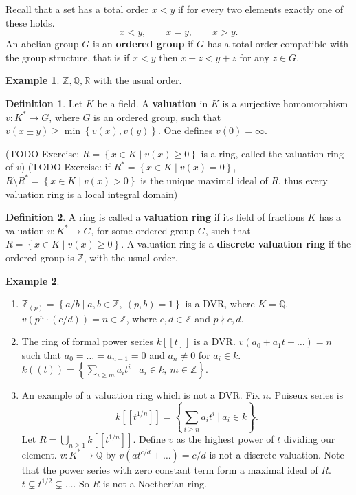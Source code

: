 \documentclass{article}
\newcommand{\Z}{\mathbb{Z}}
\newcommand{\Q}{\mathbb{Q}}
\newcommand{\R}{\mathbb{R}}
\newcommand{\rb}[1]{\left( #1 \right)}
\renewcommand{\sb}[1]{\left[ #1 \right]}
\newcommand{\cb}[1]{\left\{ #1 \right\}}
\theoremstyle{definition}\newtheorem{definition}{Definition}[section]
\theoremstyle{definition}\newtheorem{remark}[definition]{Remark}
\theoremstyle{definition}\newtheorem*{example}{Example}
\theoremstyle{definition}\newtheorem*{note}{Note}
\begin{document}
Recall that a set has a total order $ x < y $ if for every two elements exactly one of these holds.
$$ x < y, \qquad x = y, \qquad x > y. $$
An abelian group $ G $ is an \textbf{ordered group} if $ G $ has a total order compatible with the group structure, that is if $ x < y $ then $ x + z < y + z $ for any $ z \in G $.

\begin{example}
$ \Z, \Q, \R $ with the usual order.
\end{example}

\begin{definition}
Let $ K $ be a field. A \textbf{valuation} in $ K $ is a surjective homomorphism $ v : K^* \to G $, where $ G $ is an ordered group, such that $ v\rb{x \pm y} \ge \min\cb{v\rb{x}, v\rb{y}} $. One defines $ v\rb{0} = \infty $.
\end{definition}

(TODO Exercise: $ R = \cb{x \in K \mid v\rb{x} \ge 0} $ is a ring, called the valuation ring of $ v $)
(TODO Exercise: if $ R^* = \cb{x \in K \mid v\rb{x} = 0} $, $ R \setminus R^* = \cb{x \in K \mid v\rb{x} > 0} $ is the unique maximal ideal of $ R $, thus every valuation ring is a local integral domain)

\begin{definition}
A ring is called a \textbf{valuation ring} if its field of fractions $ K $ has a valuation $ v : K^* \to G $, for some ordered group $ G $, such that $ R = \cb{x \in K \mid v\rb{x} \ge 0} $. A valuation ring is a \textbf{discrete valuation ring} if the ordered group is $ \Z $, with the usual order.
\end{definition}

\begin{example}
\hfill
\begin{enumerate}
\item $ \Z_{\rb{p}} = \cb{a / b \mid a, b \in \Z, \ \rb{p, b} = 1} $ is a DVR, where $ K = \Q $. $ v\rb{p^n \cdot \rb{c / d}} = n \in \Z $, where $ c, d \in \Z $ and $ p \nmid c, d $.
\item The ring of formal power series $ k\sb{\sb{t}} $ is a DVR. $ v\rb{a_0 + a_1t + \dots} = n $ such that $ a_0 = \dots = a_{n - 1} = 0 $ and $ a_n \ne 0 $ for $ a_i \in k $. $ k\rb{\rb{t}} = \cb{\sum_{i \ge m} a_it^i \mid a_i \in k, \ m \in \Z} $.
\item An example of a valuation ring which is not a DVR. Fix $ n $. Puiseux series is
$$ k\sb{\sb{t^{1 / n}}} = \cb{\sum_{i \ge n} a_it^i \ \Bigg| \ a_i \in k}. $$
Let $ R = \bigcup_{n \ge 1} k\sb{\sb{t^{1 / n}}} $. Define $ v $ as the highest power of $ t $ dividing our element. $ v : K^* \to \Q $ by $ v\rb{at^{c / d} + \dots} = c / d $ is not a discrete valuation. Note that the power series with zero constant term form a maximal ideal of $ R $. $ t \subsetneq t^{1 / 2} \subsetneq \dots $. So $ R $ is not a Noetherian ring.
\end{enumerate}
\end{example}
\end{document}
